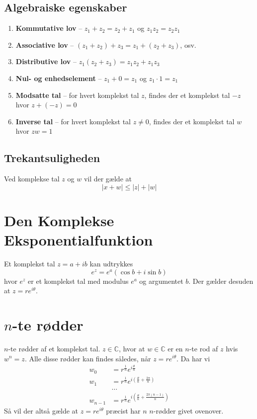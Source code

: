 \subsection{Algebraiske egenskaber}
\begin{enumerate}
    \item \textbf{Kommutative lov} -- $z_1+z_2=z_2+z_1$ og $z_1z_2=z_2z_1$
    \item \textbf{Associative lov} -- $(z_1+z_2)+z_3=z_1+(z_2+z_3)$, osv.
    \item \textbf{Distributive lov} -- $z_1(z_2+z_3)=z_1z_2+z_1z_3$
    \item \textbf{Nul- og enhedselement} -- $z_1+0=z_1$ og $z_1\cdot1=z_1$
    \item \textbf{Modsatte tal} -- for hvert komplekst tal $z$, findes der et komplekst tal $-z$ hvor $z+(-z)=0$
    \item \textbf{Inverse tal} -- for hvert komplekst tal $z\neq0$, findes der et komplekst tal $w$ hvor $zw=1$
\end{enumerate}
\subsection{Trekantsuligheden}
Ved komplekse tal $z$ og $w$ vil der gælde at \begin{equation}
    |x+w|\leq|z|+|w|
\end{equation}
\section{Den Komplekse Eksponentialfunktion}\label{eks}
Et komplekst tal $z=a+ib$ kan udtrykkes\begin{equation}
    e^z=e^a(\cos{b}+i\sin{b})
\end{equation}hvor $e^z$ er et komplekst tal med modulus $e^a$ og argumentet $b$. Der gælder desuden at $z=re^{i\theta}$.
\section{$n$-te rødder}
\begin{theorem}{$n$-te rødder af et komplekst tal.}
$z\in\mathbb{C}$, hvor at $w\in\mathbb{C}$ er en $n$-te rod af $z$ hvis $w^n=z$. Alle disse rødder kan findes således, når $z=re^{i\theta}$. Da har vi\begin{align}
    w_0&=r^{\frac{1}{n}}e^{i\frac{\theta}{n}}\\
    w_1&=r^{\frac{1}{n}}e^{i\left(\frac{\theta}{n}+\frac{2\pi}{n}\right)}\\
    &\ldots\\
    w_{n-1}&=r^{\frac{1}{n}}e^{i\left(\frac{\theta}{n}+\frac{2\pi(n-1)}{n}\right)}
\end{align}
Så vil der altså gælde at $z=re^{i\theta}$ præcist har $n$ $n$-rødder givet ovenover.
\end{theorem}
